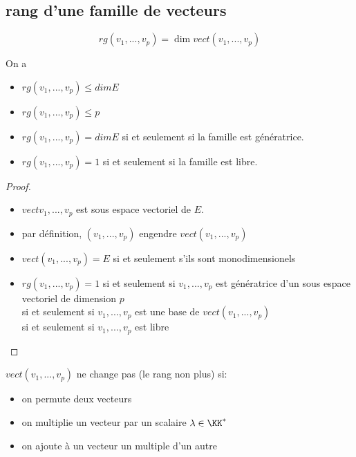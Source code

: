 \documentclass[../main.tex]{subfile}
\begin{document}
\subsection{rang d'une famille de vecteurs}
\begin{defi}
	$$rg(v_1, ..., v_p) = \dim vect(v_1, ..., v_p)$$
\end{defi}

\begin{propri}
	On a 
\begin{itemize}
	\item $rg (v_1, ..., v_p) \leq dim E$
	\item $rg (v_1, ..., v_p) \leq p$
	\item $rg (v_1, ..., v_p) = dim E$ si et seulement si la famille est génératrice.
	\item $rg (v_1, ..., v_p) = 1$ si et seulement si la famille est libre.
\end{itemize}
\begin{proof}
\begin{itemize}	
	\item $vect{v_1, ..., v_p}$ est sous espace vectoriel de $E$.
	\item par définition, $(v_1, ..., v_p)$ engendre $vect(v_1, ..., v_p)$\\
	\item $vect (v_1, ..., v_p) = E$ si et seulement s'ils sont monodimensionels
	\item $rg(v_1, ..., v_p) = 1$ si et seulement si $v_1, ..., v_p$ est génératrice d'un sous espace vectoriel de dimension $p$\\
	si et seulement si $v_1, ..., v_p$ est une base de $vect(v_1, ..., v_p)$\\
	si et seulement si $v_1, ..., v_p$ est libre
\end{itemize}
\end{proof}
\end{propri}

\begin{rema}
	$vect(v_1, ..., v_p)$ ne change pas (le rang non plus) si:
\begin{itemize}	
	\item on permute deux vecteurs
	\item on multiplie un vecteur par un scalaire $\lambda \in \KK^*$
	\item on ajoute à un vecteur un multiple d'un autre
\end{itemize}
\end{rema}
\end{document}
